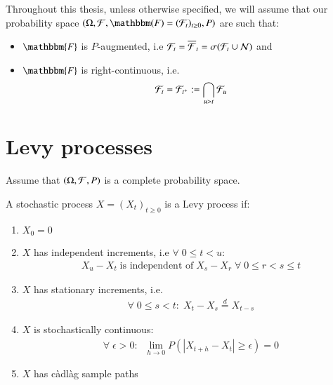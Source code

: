 \newpage 
\begin{assumption}
Throughout this thesis, unless otherwise specified, we will assume that our probability space $(\Omega, \F, \mathbbm(F) = (\F_{t})_{t\geq 0}, P)$ are such that:
\begin{itemize}
    \item $\mathbbm{F}$ is $P$-augmented, i.e $\mathcal{F}_{t} = \overline{\mathcal{F}}_{t} = \sigma(\mathcal{F}_{t}\cup \mathcal{N})$ and
    \item $\mathbbm{F}$ is right-continuous, i.e. 
    \[
    \mathcal{F}_{t} = \mathcal{F}_{t^{+}}:= \bigcap_{u>t}\mathcal{F}_{u}
    \]
\end{itemize}
\end{assumption}
\newpage 






















\newpage

\newpage
\section{Levy processes}
Assume that $(\Omega, \mathcal{F}, P)$ is a complete probability space. 

\begin{definition}
A stochastic process $X = (X_{t})_{t\geq 0}$ is a Levy process if:
\begin{enumerate}[leftmargin =*]
    \item $X_{0} = 0$
    \item $X$ has independent increments, i.e $\forall \; 0\leq t < u:$
    \begin{align*}
    X_{u}-X_{t}\;\text{is independent of}\;X_{s}-X_{r}\; \forall\; 0 \leq r < s \leq t    
    \end{align*}
    \item $X$ has stationary increments, i.e. 
    \begin{align*}
    \forall\; 0 \leq s < t: \; X_{t}-X_{s} \stackrel{d}{=} X_{t-s}
    \end{align*}
    \item $X$ is stochastically continuous: 
    \begin{align*}
    \forall \; \epsilon > 0: \;\; \lim\limits_{h \to 0}P(|X_{t+h}-X_{t}| \geq \epsilon) = 0 
    \end{align*}
    \item $X$ has càdlàg  sample paths
\end{enumerate}
\end{definition}

